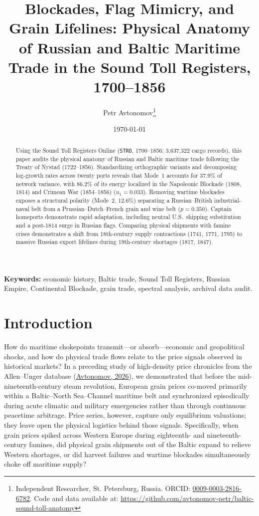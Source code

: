 \documentclass[11pt,a4paper]{article}
\title{\textbf{Blockades, Flag Mimicry, and Grain Lifelines: Physical Anatomy of Russian and Baltic Maritime Trade in the Sound Toll Registers, 1700--1856}}
\author{
    Petr Avtonomov\thanks{Independent Researcher, St. Petersburg, Russia. ORCID: \href{https://orcid.org}{0009-0003-2816-6782}. Code and data available at: \url{https://github.com/avtonomov-petr/baltic-sound-toll-anatomy}}
}
\date{\today}
\begin{document}
\maketitle

\begin{abstract}
Using the Sound Toll Registers Online (\texttt{STRO}, 1700--1856; 3,637,322 cargo records), this paper audits the physical anatomy of Russian and Baltic maritime trade following the Treaty of Nystad (1722--1856). Standardizing orthographic variants and decomposing log-growth rates across twenty ports reveals that Mode~1 accounts for 37.9\% of network variance, with 86.2\% of its energy localized in the Napoleonic Blockade (1808, 1814) and Crimean War (1854--1856) ($u_1 = 0.033$). Removing wartime blockades exposes a structural polarity (Mode~2, 12.6\%) separating a Russian--British industrial-naval belt from a Prussian--Dutch--French grain and wine belt ($p = 0.350$). Captain homeports demonstrate rapid adaptation, including neutral U.S.\ shipping substitution and a post-1814 surge in Russian flags. Comparing physical shipments with famine crises demonstrates a shift from 18th-century supply contractions (1741, 1771, 1795) to massive Russian export lifelines during 19th-century shortages (1817, 1847).
\end{abstract}


\noindent\textbf{Keywords:} economic history, Baltic trade, Sound Toll Registers, Russian Empire, Continental Blockade, grain trade, spectral analysis, archival data audit.

\section{Introduction}

How do maritime chokepoints transmit—or absorb—economic and geopolitical shocks, and how do physical trade flows relate to the price signals observed in historical markets? In a preceding study of high-density price chronicles from the Allen--Unger database (\href{https://doi.org}{Avtonomov, 2026}), we demonstrated that before the mid-nineteenth-century steam revolution, European grain prices co-moved primarily within a Baltic--North Sea--Channel maritime belt and synchronized episodically during acute climatic and military emergencies rather than through continuous peacetime arbitrage. Price series, however, capture only equilibrium valuations; they leave open the physical logistics behind those signals. Specifically, when grain prices spiked across Western Europe during eighteenth- and nineteenth-century famines, did physical grain shipments out of the Baltic expand to relieve Western shortages, or did harvest failures and wartime blockades simultaneously choke off maritime supply?
\end{document}
